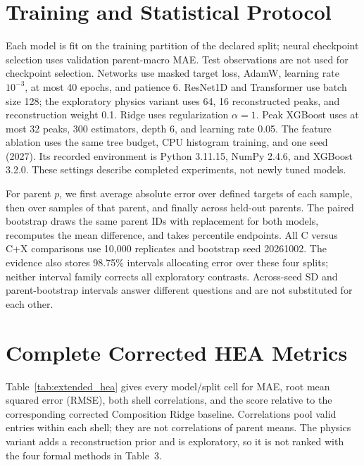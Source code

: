 \documentclass[sigconf,review,anonymous]{acmart}
\newenvironment{revision}{\ifdefined\markedcopy\color{red!70!black}\else\color{black}\fi}{}
\begin{document}
\appendix

\begin{revision}
\section{Training and Statistical Protocol}
\label{app:settings}

Each model is fit on the training partition of the declared split; neural
checkpoint selection uses validation parent-macro MAE. Test observations
are not used for checkpoint selection. Networks use masked target loss,
AdamW, learning rate $10^{-3}$, at most 40 epochs, and patience 6.
ResNet1D and Transformer use batch size 128; the exploratory physics
variant uses 64, 16 reconstructed peaks, and reconstruction weight 0.1.
Ridge uses regularization $\alpha=1$. Peak XGBoost uses at most 32 peaks,
300 estimators, depth 6, and learning rate 0.05. The feature ablation uses
the same tree budget, CPU histogram training, and one seed (2027).
Its recorded environment is Python 3.11.15, NumPy 2.4.6, and XGBoost 3.2.0.
These settings describe completed experiments, not newly tuned models.

For parent $p$, we first average absolute error over defined targets of
each sample, then over samples of that parent, and finally across held-out
parents. The paired bootstrap draws the same parent IDs with replacement
for both models, recomputes the mean difference, and takes percentile
endpoints. All C versus C+X comparisons use 10,000 replicates and bootstrap
seed 20261002. The evidence also stores 98.75\% intervals allocating error
over these four splits; neither interval family corrects all exploratory
contrasts. Across-seed SD and parent-bootstrap intervals answer different
questions and are not substituted for each other.

\section{Complete Corrected HEA Metrics}
Table~\ref{tab:extended_hea} gives every model/split cell for MAE, root mean
squared error (RMSE), both shell correlations, and the score relative to
the corresponding corrected Composition Ridge baseline. Correlations
pool valid entries within each shell; they are not correlations of
parent means. The physics variant adds a reconstruction prior and is
exploratory, so it is not ranked with the four formal methods in Table~3.

\begin{table}[t]
  \centering
  \caption{Complete corrected-label HEA results, means over recorded seeds.
  $\rho_1,\rho_2$ are per-shell Spearman correlations; $S_{\mathrm{SRO}}$
  is the clipped percentage improvement over Composition Ridge.
  Bold denotes the lowest MAE on chemistry and legacy SRO OOD, including
  the exploratory model; no statistical significance is implied.}
  \label{tab:extended_hea}
  
\end{table}


\end{revision}
\end{document}
